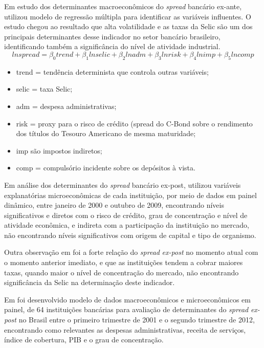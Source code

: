 \documentclass[12pt,12pt,openright,oneside,a4paper,chapter=TITLE,section=TITLE,subsection=TITLE,subsubsection=TITLE,english,french,spanish,portugues,sumario=tradicional]{abntex2}
\providecommand{\tightlist}{%
  \setlength{\itemsep}{0pt}\setlength{\parskip}{0pt}}
\begin{document}
Em estudo dos determinantes macroeconômicos do \emph{spread} bancário ex-ante,
\textcite{oreiro-2006} utilizou modelo de regressão múltipla para identificar as variáveis influentes. O estudo chegou ao resultado que alta
volatilidade e as taxas da Selic são um dos principais determinantes desse
indicador no setor bancário brasileiro, identificando também a significância do
nível de atividade industrial.
\[
ln spread = \beta_0 trend + \beta_1 ln selic + \beta_2 ln adm + \beta_3 ln risk + \beta_4 ln imp + \beta_5 ln comp
\]

\begin{itemize}
\tightlist
\item
  trend = tendência determinista que controla outras variáveis;
\item
  selic = taxa Selic;
\item
  adm = despesa administrativas;
\item
  risk = proxy para o risco de crédito (spread do C-Bond sobre o rendimento dos títulos do Tesouro Americano de mesma maturidade;
\item
  imp são impostos indiretos;
\item
  comp = compulsório incidente sobre os depósitos à vista.
\end{itemize}

Em análise dos determinantes do \emph{spread} bancário ex-post,
\textcite{dantas:2012} utilizou variáveis explanatórias microeconômicas de cada
instituição, por meio de dados em painel dinâmico, entre janeiro de 2000 e
outubro de 2009, encontrando níveis significativos e diretos com o risco de
crédito, grau de concentração e nível de atividade econômica, e indireta com a
participação da instituição no mercado, não encontrando níveis significativos
com origem de capital e tipo de organismo.

Outra observação em \textcite{dantas:2012} foi a forte relação do \emph{spread}
\emph{ex-post} no momento atual com o momento anterior imediato, e que as
instituições tendem a cobrar maiores taxas, quando maior o nível de
concentração do mercado, não encontrando significância da Selic na determinação
deste indicador.

Em \textcite{almeida:2013} foi desenvolvido modelo de dados macroeconômicos e
microeconômicos em painel, de 64 instituições bancárias para avaliação de
determinantes do \emph{spread} \emph{ex-post} no Brasil entre o primeiro trimestre de
2001 e o segundo trimestre de 2012, encontrando como relevantes
as despesas administrativas, receita de serviços, índice de cobertura, PIB e o
grau de concentração.
\end{document}
